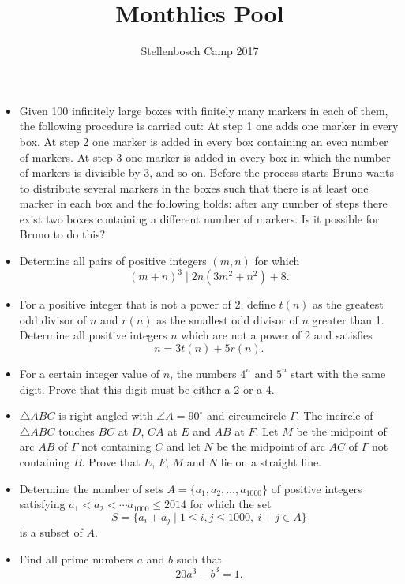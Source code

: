\documentclass[12pt]{article}
\title{Monthlies Pool}
\author{Stellenbosch Camp 2017}
\begin{document}
 \maketitle

\begin{itemize}

\item %
Given 100 infinitely large boxes with finitely many markers in each of them, the following procedure is carried out: At step 1 one adds one marker in every box. At step 2 one marker is added in every box containing an even number of markers. At step 3 one marker is added in every box in which the number of markers is divisible by 3, and so on. Before the process starts Bruno wants to distribute several markers in the boxes such that there is at least one marker in each box and the following holds: after any number of steps there exist two boxes containing a different number of markers. Is it possible for Bruno to do this?


\item %
Determine all pairs of positive integers $(m,n)$ for which
	\[(m+n)^3 \mid 2n(3m^2+n^2) + 8.\]


\item %
For a positive integer that is not a power of 2, define $t(n)$ as the greatest odd divisor of $n$ and $r(n)$ as the smallest odd divisor of $n$ greater than 1. Determine all positive integers $n$ which are not a power of 2 and satisfies
	\[ n = 3t(n)+5r(n).\]


\item %
For a certain integer value of $n$, the numbers $4^n$ and $5^n$ start with the same digit. Prove that this digit must be either a 2 or a 4.


\item %
$\triangle ABC$ is right-angled with $\angle A=90^\circ$ and circumcircle $\Gamma$. The incircle of $\triangle ABC$ touches $BC$ at $D$, $CA$ at $E$ and $AB$ at $F$. Let $M$ be the midpoint of arc $AB$ of $\Gamma$ not containing $C$ and let $N$ be the midpoint of arc $AC$ of $\Gamma$ not containing $B$. Prove that $E$, $F$, $M$ and $N$ lie on a straight line.


\item %
Determine the number of sets $A = \{a_1,a_2,\ldots, a_{1000}\}$ of positive integers satisfying $a_1 < a_2 < \cdots a_{1000} \le 2014$ for which the set
	\[ S = \{a_i+a_j \mid 1\le i,j\le 1000,\ i+j\in A\} \]
is a subset of $A$.


\item %
Find all prime numbers $a$ and $b$ such that \[ 20a^3 -b^3 = 1. \]


\end{itemize}
\end{document}
